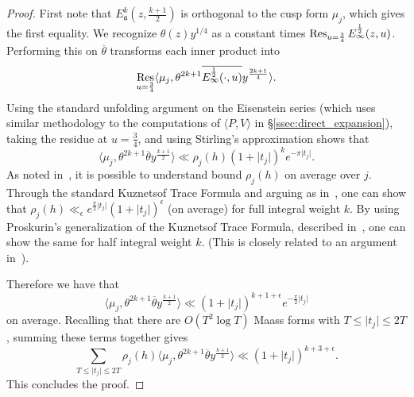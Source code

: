 \begin{proof}
  First note that $E^k_\mathfrak{a}(z, \tfrac{k+1}{2})$ is orthogonal to the cusp form
  $\mu_j$, which gives the first equality.
  We recognize $\theta(z) y^{1/4}$ as a constant times $\operatorname*{Res}_{u = \frac{3}{4}}
  E_\infty^{\frac{1}{2}}(z,u)$.
  Performing this on $\overline{\theta}$ transforms each inner product into
  \begin{equation}
    \operatorname*{Res}_{u = \frac{3}{4}} \langle \mu_j, \theta^{2k+1}
    \overline{E_\infty^{\frac{1}{2}}(\cdot,u)} y^{\frac{2k+1}{4}}\rangle.
  \end{equation}
  Using the standard unfolding argument on the Eisenstein series (which uses similar
  methodology to the computations of $\langle P, V \rangle$ in
  \S\ref{ssec:direct_expansion}), taking the residue at $u = \frac{3}{4}$, and using
  Stirling's approximation shows that
  \begin{equation}
    \langle \mu_j, \theta^{2k+1} \overline{\theta} y^{\frac{k+1}{2}} \rangle \ll \rho_j(h)
    (1 + \lvert t_j \rvert)^k e^{-\pi \lvert t_j \rvert}.
  \end{equation}
  As noted in~\cite{hulseCountingSquare}, it is possible to understand bound $\rho_j(h)$
  on average over $j$.
  Through the standard Kuznetsof Trace Formula and arguing as in~\cite{HoffsteinHulse13},
  one can show that $\rho_j(h) \ll_\epsilon e^{\frac{\pi}{2}\lvert t_j \rvert}(1 + \lvert
  t_j \rvert)^\epsilon$ (on average) for full integral weight $k$.
  By using Proskurin's generalization of the Kuznetsof Trace Formula, described
  in~\cite{Duke88}, one can show the same for half integral weight $k$.
  (This is closely related to an argument in~\cite{hulseCountingSquare}).


  Therefore we have that
  \begin{equation}
    \langle \mu_j, \theta^{2k+1} \overline{\theta} y^{\frac{k+1}{2}} \rangle \ll (1 +
    \lvert t_j \rvert)^{k + 1 + \epsilon} e^{-\frac{\pi}{2} \lvert t_j \rvert}
  \end{equation}
  on average.
  Recalling that there are $O(T^2 \log T)$ Maass forms with $T \leq \lvert t_j \rvert \leq
  2T$, summing these terms together gives
  \begin{equation}
    \sum_{T \leq \lvert t_j \rvert \leq 2T} \rho_j(h) \langle \mu_j, \theta^{2k+1}
    \overline{\theta} y^{\frac{k+1}{2}} \rangle \ll (1 + \lvert t_j \rvert)^{k + 3 +
    \epsilon}.
  \end{equation}
  This concludes the proof.
\end{proof}


